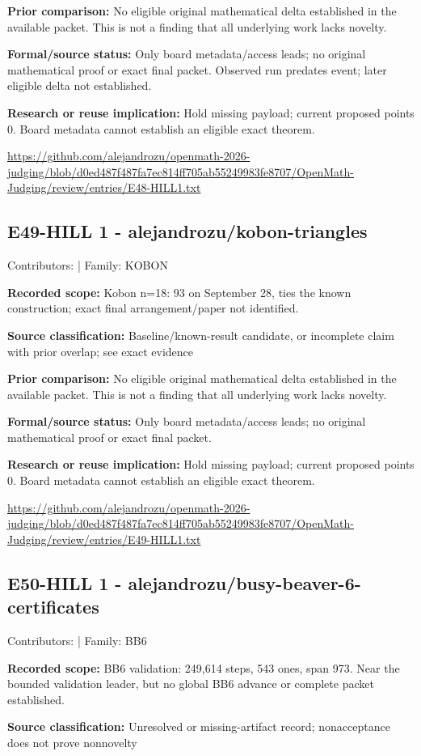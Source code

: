 \documentclass[11pt,a4paper]{article}
\begin{document}
\textbf{Prior comparison:} No eligible original mathematical delta established in the available packet. This is not a finding that all underlying work lacks novelty.

\textbf{Formal/source status:} Only board metadata/access leads; no original mathematical proof or exact final packet. Observed run predates event; later eligible delta not established.

\textbf{Research or reuse implication:} Hold missing payload; current proposed points 0. Board metadata cannot establish an eligible exact theorem.

{\small \url{https://github.com/alejandrozu/openmath-2026-judging/blob/d0ed487f487fa7ec814ff705ab55249983fe8707/OpenMath-Judging/review/entries/E48-HILL1.txt}\par}

\begin{samepage}
\subsection{E49-HILL 1  -  alejandrozu/kobon-triangles}
{\small Contributors:  | Family: KOBON\par}

\textbf{Recorded scope:} Kobon n=18: 93 on September 28, ties the known construction; exact final arrangement/paper not identified.

\end{samepage}
\textbf{Source classification:} Baseline/known-result candidate, or incomplete claim with prior overlap; see exact evidence

\textbf{Prior comparison:} No eligible original mathematical delta established in the available packet. This is not a finding that all underlying work lacks novelty.

\textbf{Formal/source status:} Only board metadata/access leads; no original mathematical proof or exact final packet. 

\textbf{Research or reuse implication:} Hold missing payload; current proposed points 0. Board metadata cannot establish an eligible exact theorem.

{\small \url{https://github.com/alejandrozu/openmath-2026-judging/blob/d0ed487f487fa7ec814ff705ab55249983fe8707/OpenMath-Judging/review/entries/E49-HILL1.txt}\par}

\begin{samepage}
\subsection{E50-HILL 1  -  alejandrozu/busy-beaver-6-certificates}
{\small Contributors:  | Family: BB6\par}

\textbf{Recorded scope:} BB6 validation: 249,614 steps, 543 ones, span 973. Near the bounded validation leader, but no global BB6 advance or complete packet established.

\end{samepage}
\textbf{Source classification:} Unresolved or missing-artifact record; nonacceptance does not prove nonnovelty
\end{document}
